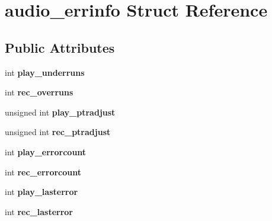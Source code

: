 \hypertarget{structaudio__errinfo}{}\section{audio\+\_\+errinfo Struct Reference}
\label{structaudio__errinfo}
\subsection*{Public Attributes}
\begin{DoxyCompactItemize}
\item 
int {\bfseries play\+\_\+underruns}\hypertarget{structaudio__errinfo_aa2b7ee9ea57f003e511ed755d8c48387}{}\label{structaudio__errinfo_aa2b7ee9ea57f003e511ed755d8c48387}

\item 
int {\bfseries rec\+\_\+overruns}\hypertarget{structaudio__errinfo_ac5fc4247772c8b49aa192d95836737b0}{}\label{structaudio__errinfo_ac5fc4247772c8b49aa192d95836737b0}

\item 
unsigned int {\bfseries play\+\_\+ptradjust}\hypertarget{structaudio__errinfo_addb541b673f0d2fc71d3bcb1fcb76b98}{}\label{structaudio__errinfo_addb541b673f0d2fc71d3bcb1fcb76b98}

\item 
unsigned int {\bfseries rec\+\_\+ptradjust}\hypertarget{structaudio__errinfo_a0ba0995d27f489e6ae3c1a029d5b175d}{}\label{structaudio__errinfo_a0ba0995d27f489e6ae3c1a029d5b175d}

\item 
int {\bfseries play\+\_\+errorcount}\hypertarget{structaudio__errinfo_a2473c8e86cf1f05f5fab1454e04ecba0}{}\label{structaudio__errinfo_a2473c8e86cf1f05f5fab1454e04ecba0}

\item 
int {\bfseries rec\+\_\+errorcount}\hypertarget{structaudio__errinfo_a307028cc80c574153a11cb3d04d838ec}{}\label{structaudio__errinfo_a307028cc80c574153a11cb3d04d838ec}

\item 
int {\bfseries play\+\_\+lasterror}\hypertarget{structaudio__errinfo_a44bb6a170ddfebf1496b3f19f1f3a7a2}{}\label{structaudio__errinfo_a44bb6a170ddfebf1496b3f19f1f3a7a2}

\item 
int {\bfseries rec\+\_\+lasterror}\hypertarget{structaudio__errinfo_add10ea4ca5f1236f339d36d1bc8219bc}{}\label{structaudio__errinfo_add10ea4ca5f1236f339d36d1bc8219bc}


\end{DoxyCompactItemize}
